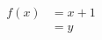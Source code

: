 \begin{equation}
\begin{aligned}
f(x) &= x + 1\\
     &= y \label{eq:nested}
\end{aligned}
\end{equation}
